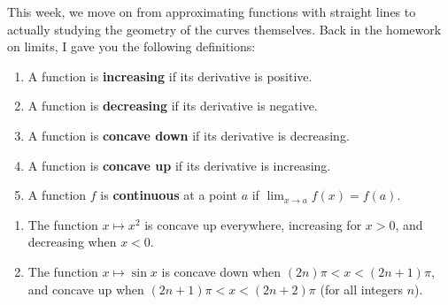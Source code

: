 


This week, we move on from approximating functions with straight lines to actually studying the geometry of the
curves themselves. Back in the homework on limits, I gave you the following definitions:

\begin{defn}\leavevmode
  \begin{enumerate}
    \item A function is \textbf{increasing} if its derivative is positive.
    \item A function is \textbf{decreasing} if its derivative is negative.
    \item A function is \textbf{concave down} if its derivative is decreasing.
    \item A function is \textbf{concave up} if its derivative is increasing.
    \item A function $ f $ is \textbf{continuous} at a point $ a $ if $ \lim_{x \to a} f(x) = f(a) $.
  \end{enumerate}
\end{defn}

\begin{exs}\leavevmode
  \begin{enumerate}
    \item The function $ x \mapsto x^2 $ is concave up everywhere, increasing for $ x > 0 $, and decreasing when $ x < 0 $.
    \item The function $ x \mapsto \sin x $ is concave down when $ (2n)\pi < x < (2n + 1)\pi $, and concave up when $ (2n + 1)\pi < x < (2n + 2)\pi $
          (for all integers $ n $).
          \begin{center}
          \end{center}
  \end{enumerate}
\end{exs}

